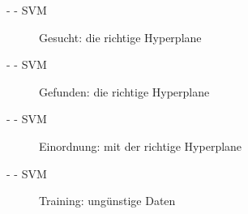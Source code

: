 \documentclass[fleqn,11pt,aspectratio=43]{beamer}
\begin{document}
\begin{frame}{\insertsectionhead - \insertsubsectionhead - SVM}
\begin{figure}
\scalebox{.7}{}
\caption{Gesucht: die richtige Hyperplane}
\end{figure}
\end{frame}

\begin{frame}{\insertsectionhead - \insertsubsectionhead - SVM}
\begin{figure}
\scalebox{.8}{}
\caption{Gefunden: die richtige Hyperplane}
\end{figure}
\end{frame}

\begin{frame}{\insertsectionhead - \insertsubsectionhead - SVM}
\begin{figure}
\scalebox{.8}{}
\caption{Einordnung: mit der richtige Hyperplane}
\end{figure}
\end{frame}

\begin{frame}{\insertsectionhead - \insertsubsectionhead - SVM}
\begin{figure}
\scalebox{1.0}{}
\caption{Training: ungünstige Daten}
\end{figure}
\end{frame}

%
%
\end{document}
